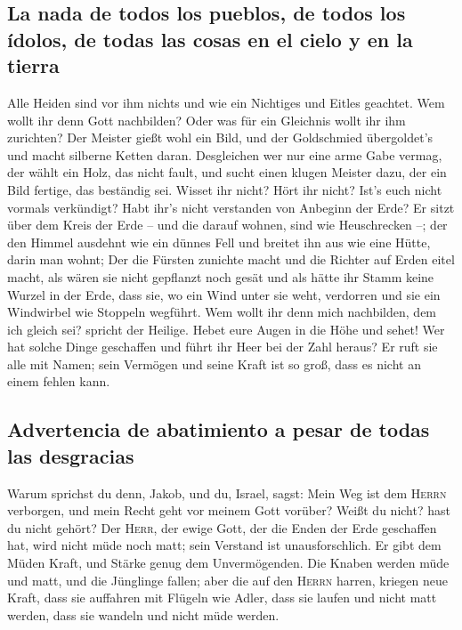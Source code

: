 \hypertarget{la-nada-de-todos-los-pueblos-de-todos-los-uxeddolos-de-todas-las-cosas-en-el-cielo-y-en-la-tierra}{%
\subsection{La nada de todos los pueblos, de todos los ídolos, de todas
las cosas en el cielo y en la
tierra}\label{la-nada-de-todos-los-pueblos-de-todos-los-uxeddolos-de-todas-las-cosas-en-el-cielo-y-en-la-tierra}}

 Alle Heiden sind vor ihm nichts und wie ein Nichtiges
und Eitles geachtet.  Wem wollt ihr denn Gott nachbilden?
Oder was für ein Gleichnis wollt ihr ihm zurichten?  Der
Meister gießt wohl ein Bild, und der Goldschmied übergoldet's und macht
silberne Ketten daran.  Desgleichen wer nur eine arme
Gabe vermag, der wählt ein Holz, das nicht fault, und sucht einen klugen
Meister dazu, der ein Bild fertige, das beständig sei. 
Wisset ihr nicht? Hört ihr nicht? Ist's euch nicht vormals verkündigt?
Habt ihr's nicht verstanden von Anbeginn der Erde?  Er
sitzt über dem Kreis der Erde -- und die darauf wohnen, sind wie
Heuschrecken --; der den Himmel ausdehnt wie ein dünnes Fell und breitet
ihn aus wie eine Hütte, darin man wohnt;  Der die Fürsten
zunichte macht und die Richter auf Erden eitel macht, 
als wären sie nicht gepflanzt noch gesät und als hätte ihr Stamm keine
Wurzel in der Erde, dass sie, wo ein Wind unter sie weht, verdorren und
sie ein Windwirbel wie Stoppeln wegführt.  Wem wollt ihr
denn mich nachbilden, dem ich gleich sei? spricht der Heilige.
 Hebet eure Augen in die Höhe und sehet! Wer hat solche
Dinge geschaffen und führt ihr Heer bei der Zahl heraus? Er ruft sie
alle mit Namen; sein Vermögen und seine Kraft ist so groß, dass es nicht
an einem fehlen kann.

\hypertarget{advertencia-de-abatimiento-a-pesar-de-todas-las-desgracias}{%
\subsection{Advertencia de abatimiento a pesar de todas las
desgracias}\label{advertencia-de-abatimiento-a-pesar-de-todas-las-desgracias}}

 Warum sprichst du denn, Jakob, und du, Israel, sagst:
Mein Weg ist dem \textsc{Herrn} verborgen, und mein Recht geht vor
meinem Gott vorüber?  Weißt du nicht? hast du nicht
gehört? Der \textsc{Herr}, der ewige Gott, der die Enden der Erde
geschaffen hat, wird nicht müde noch matt; sein Verstand ist
unausforschlich.  Er gibt dem Müden Kraft, und Stärke
genug dem Unvermögenden.  Die Knaben werden müde und
matt, und die Jünglinge fallen;  aber die auf den
\textsc{Herrn} harren, kriegen neue Kraft, dass sie auffahren mit
Flügeln wie Adler, dass sie laufen und nicht matt werden, dass sie
wandeln und nicht müde werden.

